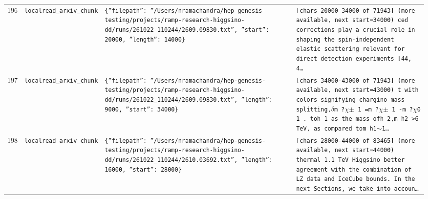 \documentclass[11pt,a4paper]{article}
\begin{document}
\begin{longtable}{@{}p{}p{}p{}p{}@{}}
196 & \texttt{local}\newline\texttt{read\_\allowbreak{}arxiv\_\allowbreak{}chunk} & \texttt{\{''filepath'':\allowbreak{} ''/\allowbreak{}Users/\allowbreak{}nramachandra/\allowbreak{}hep-genesis-testing/\allowbreak{}projects/\allowbreak{}ramp-research-higgsino-dd/\allowbreak{}runs/\allowbreak{}261022\_\allowbreak{}110244/\allowbreak{}2609.09830.txt'',\allowbreak{} ''start'':\allowbreak{} 20000,\allowbreak{} ''length'':\allowbreak{} 14000\}\allowbreak{}} & \texttt{[chars 20000-34000 of 71943]\allowbreak{} (more available,\allowbreak{} next start=\allowbreak{}34000)\allowbreak{}  ced corrections play a crucial role in shaping the spin-independent elastic scattering relevant for direct detection experiments [44,\allowbreak{} 4\ldots{}\allowbreak{}} \\
197 & \texttt{local}\newline\texttt{read\_\allowbreak{}arxiv\_\allowbreak{}chunk} & \texttt{\{''filepath'':\allowbreak{} ''/\allowbreak{}Users/\allowbreak{}nramachandra/\allowbreak{}hep-genesis-testing/\allowbreak{}projects/\allowbreak{}ramp-research-higgsino-dd/\allowbreak{}runs/\allowbreak{}261022\_\allowbreak{}110244/\allowbreak{}2609.09830.txt'',\allowbreak{} ''length'':\allowbreak{} 9000,\allowbreak{} ''start'':\allowbreak{} 34000\}\allowbreak{}} & \texttt{[chars 34000-43000 of 71943]\allowbreak{} (more available,\allowbreak{} next start=\allowbreak{}43000)\allowbreak{}  t with colors signifying chargino mass splitting,\allowbreak{}$\delta$m ?$\chi$$\pm$ 1 =\allowbreak{}m ?$\chi$$\pm$ 1 -m ?$\chi$0 1 . toh 1 as the mass ofh 2,\allowbreak{}m h2 \textgreater{}\allowbreak{}6 TeV,\allowbreak{} as compared tom h1$\sim$1\ldots{}\allowbreak{}} \\
198 & \texttt{local}\newline\texttt{read\_\allowbreak{}arxiv\_\allowbreak{}chunk} & \texttt{\{''filepath'':\allowbreak{} ''/\allowbreak{}Users/\allowbreak{}nramachandra/\allowbreak{}hep-genesis-testing/\allowbreak{}projects/\allowbreak{}ramp-research-higgsino-dd/\allowbreak{}runs/\allowbreak{}261022\_\allowbreak{}110244/\allowbreak{}2610.03692.txt'',\allowbreak{} ''length'':\allowbreak{} 16000,\allowbreak{} ''start'':\allowbreak{} 28000\}\allowbreak{}} & \texttt{[chars 28000-44000 of 83465]\allowbreak{} (more available,\allowbreak{} next start=\allowbreak{}44000)\allowbreak{}  thermal 1.1 TeV Higgsino better agreement with the combination of LZ data and IceCube bounds. In the next Sections,\allowbreak{} we take into accoun\ldots{}\allowbreak{}} \\

\end{longtable}
\end{document}

